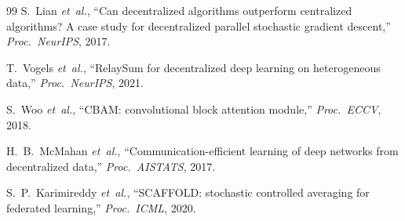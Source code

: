 \documentclass[conference]{IEEEtran}
\begin{document}
\begin{thebibliography}{99}
S.~Lian \emph{et~al.},
``Can decentralized algorithms outperform centralized algorithms? A
case study for decentralized parallel stochastic gradient descent,''
\emph{Proc.~NeurIPS}, 2017.

T.~Vogels \emph{et~al.},
``RelaySum for decentralized deep learning on heterogeneous data,''
\emph{Proc.~NeurIPS}, 2021.

S.~Woo \emph{et~al.},
``CBAM: convolutional block attention module,''
\emph{Proc.~ECCV}, 2018.

H.~B.~McMahan \emph{et~al.},
``Communication-efficient learning of deep networks from
decentralized data,''
\emph{Proc.~AISTATS}, 2017.

S.~P.~Karimireddy \emph{et~al.},
``SCAFFOLD: stochastic controlled averaging for federated learning,''
\emph{Proc.~ICML}, 2020.

\end{thebibliography}
\end{document}
